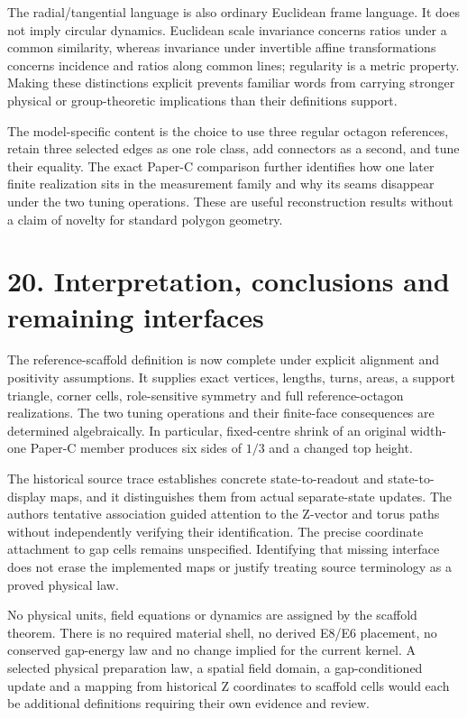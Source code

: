 \documentclass[
  11pt,
  a4paper,
]{article}
\begin{document}
The radial/tangential language is also ordinary Euclidean frame language. It does not imply circular dynamics. Euclidean scale invariance concerns ratios under a common similarity, whereas invariance under invertible affine transformations concerns incidence and ratios along common lines; regularity is a metric property. Making these distinctions explicit prevents familiar words from carrying stronger physical or group-theoretic implications than their definitions support.

The model-specific content is the choice to use three regular octagon references, retain three selected edges as one role class, add connectors as a second, and tune their equality. The exact Paper-C comparison further identifies how one later finite realization sits in the measurement family and why its seams disappear under the two tuning operations. These are useful reconstruction results without a claim of novelty for standard polygon geometry.

\section{20. Interpretation, conclusions and remaining interfaces}\label{interpretation-conclusions-and-remaining-interfaces}

The reference-scaffold definition is now complete under explicit alignment and positivity assumptions. It supplies exact vertices, lengths, turns, areas, a support triangle, corner cells, role-sensitive symmetry and full reference-octagon realizations. The two tuning operations and their finite-face consequences are determined algebraically. In particular, fixed-centre shrink of an original width-one Paper-C member produces six sides of \(1/3\) and a changed top height.

The historical source trace establishes concrete state-to-readout and state-to-display maps, and it distinguishes them from actual separate-state updates. The author\textquotesingle s tentative association guided attention to the Z-vector and torus paths without independently verifying their identification. The precise coordinate attachment to gap cells remains unspecified. Identifying that missing interface does not erase the implemented maps or justify treating source terminology as a proved physical law.

No physical units, field equations or dynamics are assigned by the scaffold theorem. There is no required material shell, no derived E8/E6 placement, no conserved gap-energy law and no change implied for the current kernel. A selected physical preparation law, a spatial field domain, a gap-conditioned update and a mapping from historical Z coordinates to scaffold cells would each be additional definitions requiring their own evidence and review.
\end{document}
